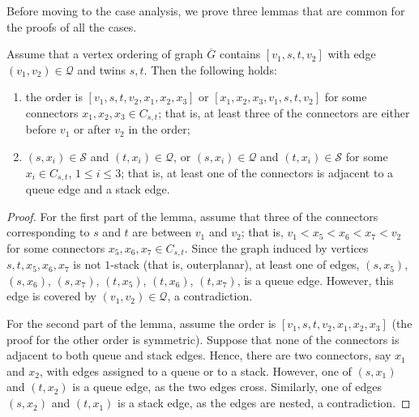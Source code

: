 \documentclass[orivec]{llncs}
\newcommand{\Sh}{{\ensuremath{\mathcal{S}}}}
\newcommand{\Qh}{{\ensuremath{\mathcal{Q}}}}
\newcommand{\Gc}{{\ensuremath{\overline{G}}}}
\begin{document}
Before moving to the case analysis, we prove three lemmas that are common for the proofs of all the cases.

\begin{lemma}
    \label{lm:RR}
    Assume that a vertex ordering of graph $\Gc$ contains $[v_1, s, t, v_2]$ with edge $(v_1, v_2) \in \Qh$ and
    twins $s, t$. Then the following holds:
    
    \begin{enumerate}[label={\bf\thelemma\alph*}]
        \item the order is $[v_1, s, t, v_2, x_1, x_2, x_3]$ or $[x_1, x_2, x_3, v_1, s, t, v_2]$
        for some connectors $x_1, x_2, x_3 \in C_{s,t}$; that is,        
        at least three of the connectors are either before $v_1$ or after $v_2$ in the order;
        \label{lm:RR1}
        
        \item $(s, x_i) \in \Sh$ and $(t, x_i) \in \Qh$, or $(s, x_i) \in \Qh$ and $(t, x_i) \in \Sh$
        for some $x_i \in C_{s,t}$, $1 \le i \le 3$; that is, at least one of the connectors is adjacent 
        to a queue edge and a stack edge. 
        \label{lm:RR2}
    \end{enumerate}
\end{lemma}

\begin{proof}
    For the first part of the lemma, assume that three of the connectors corresponding to $s$ and $t$ are
    between $v_1$ and $v_2$; that is, $v_1 < x_5 < x_6 < x_7 < v_2$ for some connectors $x_5, x_6, x_7 \in C_{s,t}$.
    Since the graph induced by vertices $s, t, x_5, x_6, x_7$ is not $1$-stack (that is, outerplanar), at
    least one of edges, $(s, x_5)$, $(s, x_6)$, $(s, x_7)$, $(t, x_5)$, $(t, x_6)$, $(t, x_7)$, is a queue edge.
    However, this edge is covered by $(v_1, v_2) \in \Qh$, a contradiction.
    
    For the second part of the lemma, assume the order is $[v_1, s, t, v_2, x_1, x_2, x_3]$ (the proof for the other
    order is symmetric). 
    Suppose that none of the connectors is adjacent to both queue and stack edges. Hence, there are two connectors, say $x_1$ and
    $x_2$, with edges assigned to a queue or to a stack. However, 
    one of $(s, x_1)$ and $(t, x_2)$ is a queue edge, as the two edges cross. Similarly, one of edges 
    $(s, x_2)$ and $(t, x_1)$ is a stack edge, as the edges are nested, a contradiction.
\end{proof}    
\end{document}
